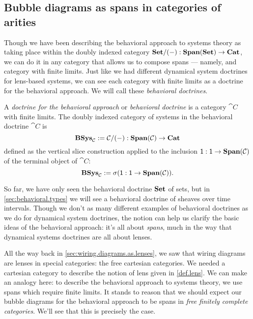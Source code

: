 \documentclass[DynamicalBook]{subfiles}
\begin{document}
\subsection{Bubble diagrams as spans in categories of arities}\label{sec:behavioral.diagrams}

Though we have been describing the behavioral approach to systems theory as
taking place within the doubly indexed category $\textbf{Set}/(-) :
\textbf{Span}(\textbf{Set}) \to \textbf{Cat}$, we can do it in any category that allows
us to compose spans --- namely, and category with finite limits. Just like we
had different dynamical system doctrines for lens-based systems, we can see each
category with finite limits as a doctrine for the behavioral approach. We will
call these \emph{behavioral doctrines}.

\begin{definition}
A \emph{doctrine for the behavioral approach} or \emph{behavioral doctrine} is a
category $\cat{C}$ with finite limits. The doubly indexed category of systems in
the behavioral doctrine $\cat{C}$ is 
$$\textbf{BSys}_{\mathcal{C}} := \mathcal{C}/(-) : \textbf{Span}(\mathcal{C}) \to \textbf{Cat}$$
defined as the vertical slice construction applied to the inclusion $\mathsf{1} :
\mathsf{1} \to \textbf{Span}(\mathcal{C})$ of the terminal object of $\cat{C}$:
\[
\textbf{BSys}_{\mathcal{C}} := \sigma(\mathsf{1} : \mathsf{1} \to \textbf{Span}(\mathcal{C})).
\]
\end{definition}

So far, we have only seen the behavioral doctrine $\textbf{Set}$ of sets, but in
\cref{sec:behavioral.types} we will see a behavioral doctrine of sheaves over
time intervals. Though we don't as many different examples of behavioral
doctrines as we do for dynamical system doctrines, the notion can help us
clarify the basic ideas of the behavioral approach: it's all about \emph{spans},
much in the way that dynamical systems doctrines are all about lenses.

All the way back in \cref{sec:wiring.diagrams.as.lenses}, we saw that wiring
diagrams are lenses in special categories: the free cartesian categories. We
needed a cartesian category to describe the notion of lens given in
\cref{def.lens}. We can make an analogy here: to describe the behavioral
approach to systems theory, we use spans which require finite limits. It stands
to reason that we should expect our bubble diagrams for the behavioral approach
to be spans in \emph{free finitely complete categories}. We'll see that this is
precisely the case.
\end{document}
